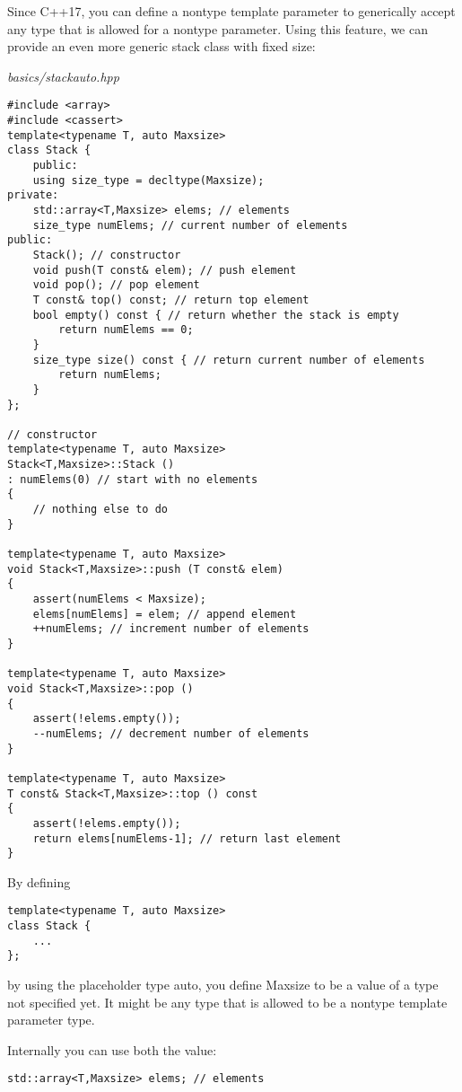 Since C++17, you can define a nontype template parameter to generically accept any type that is allowed for a nontype parameter. Using this feature, we can provide an even more generic stack class with fixed size:

\noindent
\textit{basics/stackauto.hpp}
\begin{lstlisting}[style=styleCXX]
#include <array>
#include <cassert>
template<typename T, auto Maxsize>
class Stack {
	public:
	using size_type = decltype(Maxsize);
private:
	std::array<T,Maxsize> elems; // elements
	size_type numElems; // current number of elements
public:
	Stack(); // constructor
	void push(T const& elem); // push element
	void pop(); // pop element
	T const& top() const; // return top element
	bool empty() const { // return whether the stack is empty
		return numElems == 0;
	}
	size_type size() const { // return current number of elements
		return numElems;
	}
};

// constructor
template<typename T, auto Maxsize>
Stack<T,Maxsize>::Stack ()
: numElems(0) // start with no elements
{
	// nothing else to do
}

template<typename T, auto Maxsize>
void Stack<T,Maxsize>::push (T const& elem)
{
	assert(numElems < Maxsize);
	elems[numElems] = elem; // append element
	++numElems; // increment number of elements
}

template<typename T, auto Maxsize>
void Stack<T,Maxsize>::pop ()
{
	assert(!elems.empty());
	--numElems; // decrement number of elements
}

template<typename T, auto Maxsize>
T const& Stack<T,Maxsize>::top () const
{
	assert(!elems.empty());
	return elems[numElems-1]; // return last element
}
\end{lstlisting}

By defining

\begin{lstlisting}[style=styleCXX]
template<typename T, auto Maxsize>
class Stack {
	...
};
\end{lstlisting}

by using the placeholder type auto, you define Maxsize to be a value of a type not specified yet. It might be any type that is allowed to be a nontype template parameter type.

Internally you can use both the value:

\begin{lstlisting}[style=styleCXX]
std::array<T,Maxsize> elems; // elements
\end{lstlisting}

